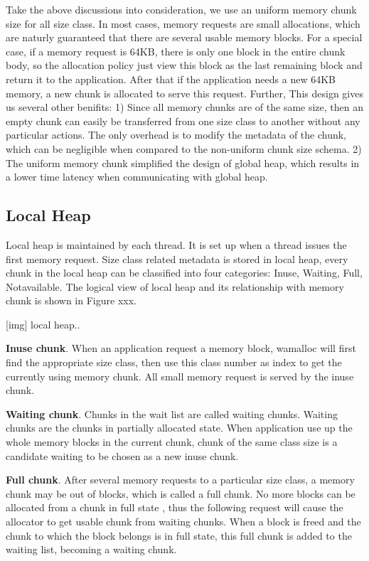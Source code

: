 \documentclass{vldb}
\begin{document}
Take the above discussions into consideration, we use an uniform memory chunk size for all size class. 
In most cases, memory requests are small allocations, which are naturly guaranteed that there are several usable memory blocks. 
For a special case, if a memory request is 64KB, there is only one block in the entire chunk body, so the allocation policy just view this block as the last remaining block and return it to the application. After that if the application needs a new 64KB memory, a new chunk is allocated to serve this request.
Further, This design gives us several other benifits: 
1) Since all memory chunks are of the same size, then an empty chunk can easily be transferred from one size class to another without any particular actions.
The only overhead is to modify the metadata of the chunk, which can be negligible when compared to the non-uniform chunk size schema. 
2) The uniform memory chunk simplified the design of global heap, which results in a lower time latency when communicating with global heap.

\subsection{Local Heap}

Local heap is maintained by each thread. 
It is set up when a thread issues the first memory request.
Size class related metadata is stored in local heap, every chunk in the local heap can be classified into four categories: Inuse, Waiting, Full, Notavailable. 
The logical view of local heap and its relationship with memory chunk is shown in Figure xxx.

[img] local heap..

\textbf{Inuse chunk}. When an application request a memory block, wamalloc will first find the appropriate size class, then use this class number as index to get the currently using memory chunk. 
All small memory request is served by the inuse chunk.

\textbf{Waiting chunk}. Chunks in the wait list are called waiting chunks. Waiting chunks are the chunks in partially allocated state. 
When application use up the whole memory blocks in the current chunk, chunk of the same class size is a candidate waiting to be chosen as a new inuse chunk.

\textbf{Full chunk}. After several memory requests to a particular size class, a memory chunk may be out of blocks, which is called a full chunk.
No more blocks can be allocated from a chunk in full state , thus the following request will cause the allocator to get usable chunk from waiting chunks.
When a block is freed and the chunk to which the block belongs is in full state, this full chunk is added to the waiting list, becoming a waiting chunk.
\end{document}
